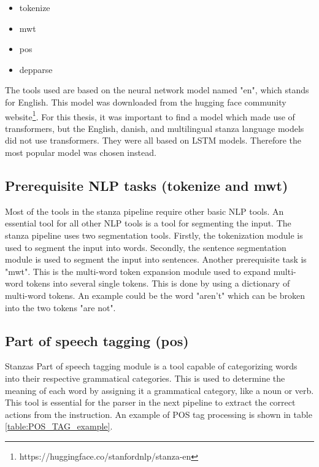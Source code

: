 \begin{itemize}
    \item tokenize
    \item mwt
    \item pos
    \item depparse
\end{itemize}

The tools used are based on the neural network model named "en", which stands for English. This model was downloaded from the hugging face community website\footnote{https://huggingface.co/stanfordnlp/stanza-en}. For this thesis, it was important to find a model which made use of transformers, but the English, danish, and multilingual stanza language models did not use transformers. They were all based on LSTM models. Therefore the most popular model was chosen instead.


\subsection{Prerequisite NLP tasks (tokenize and mwt)} \label{sec:Prerequisite_NLP}
Most of the tools in the stanza pipeline require other basic NLP tools.
An essential tool for all other NLP tools is a tool for segmenting the input. The stanza pipeline uses two segmentation tools. Firstly, the tokenization module is used to segment the input into words. Secondly, the sentence segmentation module is used to segment the input into sentences. Another prerequisite task is "mwt". This is the multi-word token expansion module used to expand multi-word tokens into several single tokens. This is done by using a dictionary of multi-word tokens. An example could be the word "aren't" which can be broken into the two tokens "are not".
\subsection{Part of speech tagging (pos)} \label{sec:POS}
Stanzas Part of speech tagging module is a tool capable of categorizing words into their respective grammatical categories.
This is used to determine the meaning of each word by assigning it a grammatical category, like a noun or verb. This tool is essential for the parser in the next pipeline to extract the correct actions from the instruction. An example of POS tag processing is shown in table \ref{table:POS_TAG_example}.


